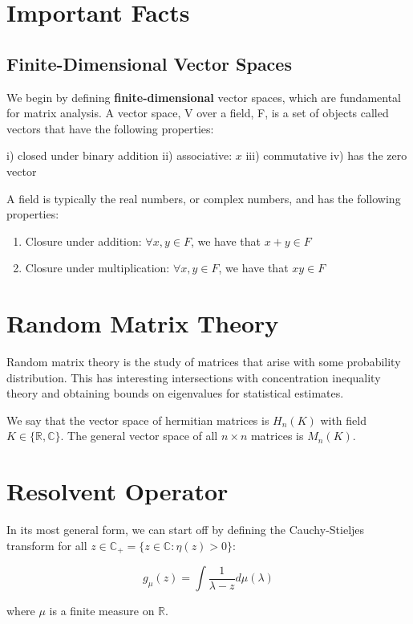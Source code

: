 \documentclass[class=article, crop=false]{standalone}
\begin{document}
\section{Important Facts}
	\subsection{Finite-Dimensional Vector Spaces}
	We begin by defining \textbf{finite-dimensional} vector spaces, which are fundamental for matrix analysis. A vector space, V over a field, F, is a set of objects called vectors that have the following properties:

	i) closed under binary addition
	ii) associative: $x$
	iii) commutative
	iv) has the zero vector

	A field is typically the real numbers, or complex numbers, and has the following properties:

	\begin{enumerate}
		\item Closure under addition: $\forall x, y \in F$, we have that $x+y \in F$
		\item Closure under multiplication: $\forall x, y \in F$, we have that $xy \in F$
	\end{enumerate}

\section{Random Matrix Theory}
	Random matrix theory is the study of matrices that arise with some probability distribution. This has interesting intersections with concentration inequality theory and obtaining bounds on eigenvalues for statistical estimates.

	We say that the vector space of hermitian matrices is $H_n(K)$ with field $K \in \{\mathbb{R}, \mathbb{C}\}$. The general vector space of all $n \times n$ matrices is $M_n(K)$.

\section{Resolvent Operator}
	
	In its most general form, we can start off by defining the Cauchy-Stieljes transform for all $z \in \mathbb{C}_+ = \{z \in \mathbb{C}: \eta(z) > 0 \}$:

		$$g_\mu(z) = \int \frac{1}{\lambda - z}  d\mu(\lambda)$$

	where $\mu$ is a finite measure on $\mathbb{R}$. 
\end{document}
